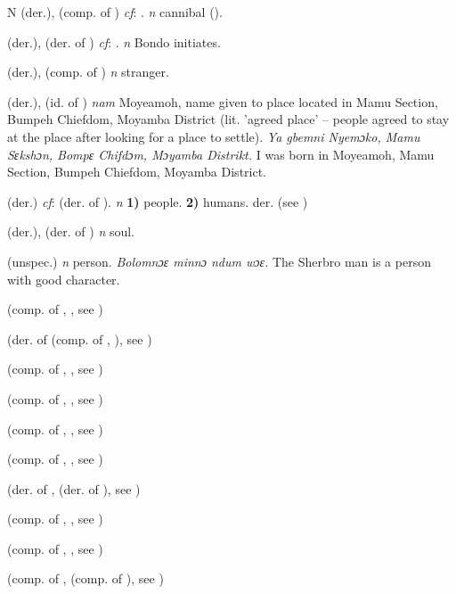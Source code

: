 \begin{letter}{N}
 (der.), (comp. of ) \textit{cf}: . \textit{n} cannibal (\citealt{Pichl1967}).

 (der.), (der. of ) \textit{cf}: . \textit{n} Bondo initiates.

 (der.), (comp. of ) \textit{n} stranger.

 (der.), (id. of ) \textit{nam} Moyeamoh, name given to place located in Mamu Section, Bumpeh Chiefdom, Moyamba District (lit. 'agreed place' – people agreed to stay at the place after looking for a place to settle). \textit{Ya gbemni Nyemɔko, Mamu Sɛkshɔn, Bompɛ Chifdɔm, Mɔyamba Distrikt.} I was born in Moyeamoh, Mamu Section, Bumpeh Chiefdom, Moyamba District.

 (der.) \textit{cf}:  (der. of ). \textit{n} \textbf{1)} people. \textbf{2)} humans. der.  (see ) 

 (der.), (der. of ) \textit{n} soul.

 (unspec.) \textit{n} person. \textit{Bolomnɔɛ minnɔ ndum wɔɛ.} The Sherbro man is a person with good character.

 (comp. of , , see )

 (der. of  (comp. of , ), see ) 

 (comp. of , , see ) 

 (comp. of , , see ) 

 (comp. of , , see ) 

 (comp. of , , see ) 

 (der. of ,  (der. of ), see )

 (comp. of , , see ) 

 (comp. of , , see ) 

 (comp. of ,  (comp. of ), see ) 


\end{letter}
